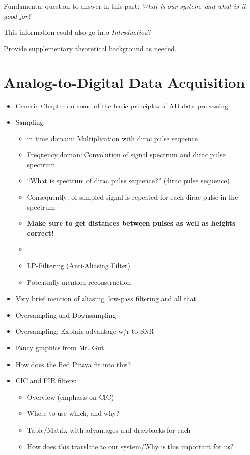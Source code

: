 \documentclass[a4paper,oneside]{alpenthesis/alpenthesis}
\begin{document}
Fundamental question  to answer in  this part:  \emph{What is our  system, and
what is it good for?}

This information could also go into \emph{Introduction}?

Provide supplementary theoretical background as needed.


\chapter{Analog-to-Digital Data Acquisition} %
\label{ch:analog-to-digital_data_aquisition}

\begin{itemize}
    \item
    Generic Chapter on some of the basic principles of AD data processing
    \item
    Sampling:
        \begin{itemize}
            \item
             in time domain: Multiplication with dirac pulse sequence
            \item
            Frequency doman: Convolution of signal spectrum and dirac pulse spectrum
            \item
            ``What is spectrum of dirac pulse sequence?'' (dirac pulse sequence)
            \item
            Consequently:  of sampled signal is repeated for each dirac pulse in the spectrum
            \item
            \textbf{Make sure to get distances between pulses as well as heights correct!}
            \item
            \item
            LP-Filtering (Anti-Aliasing Filter)
            \item
            Potentially mention reconstruction
        \end{itemize}
    \item 
    Very brief mention of aliasing, low-pass filtering and all that
    \item
    Oversampling and Downsampling
    \item
    Oversampling: Explain advantage w/r to SNR
    \item
    Fancy graphics from Mr. Gut
    \item
    How does the Red Pitaya fit into this?
    \item
    CIC and FIR filters:
        \begin{itemize}
            \item
            Overview (emphasis on CIC)
            \item
            Where to use which, and why?
            \item
            Table/Matrix with advantages and drawbacks for each
            \item
            How does this translate to our system/Why is this important for us?
        \end{itemize}
\end{itemize}
\end{document}
